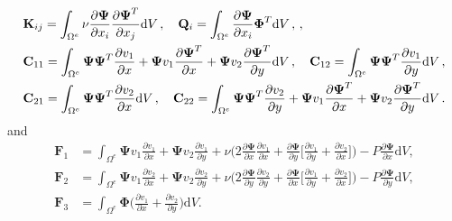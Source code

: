 \documentclass[]{article}
\begin{document}
\begin{equation}\label{eq13}
	\begin{aligned}
		&\mathbf{K}_{ij} = \int_{\Omega^e} \nu \frac{\partial\boldsymbol{\Psi}}{\partial x_i} \frac{\partial\boldsymbol{\Psi}^T}{\partial x_j}\mathrm{d}V\thinspace, \quad \mathbf{Q}_i = \int_{\Omega^e}\frac{\partial\boldsymbol{\Psi}}{\partial x_i} \boldsymbol{\Phi}^T \mathrm{d}V\thinspace, \thinspace,\\
		&\mathbf{C}_{11} = \int_{\Omega^e} \boldsymbol{\Psi} \boldsymbol{\Psi}^T \frac{\partial v_1}{\partial x} + \boldsymbol{\Psi} v_1 \frac{\partial \boldsymbol{\Psi}^T}{\partial x} + \boldsymbol{\Psi} v_2 \frac{\partial \boldsymbol{\Psi}^T}{\partial y}\mathrm{d}V\thinspace, \quad
		\mathbf{C}_{12} = \int_{\Omega^e}\boldsymbol{\Psi} \boldsymbol{\Psi}^T \frac{\partial v_1}{\partial y} \mathrm{d}V\thinspace,\\
		&\mathbf{C}_{21} = \int_{\Omega^e} \boldsymbol{\Psi} \boldsymbol{\Psi}^T \frac{\partial v_2}{\partial x}\mathrm{d}V\thinspace,\quad
		\mathbf{C}_{22} = \int_{\Omega^e} \boldsymbol{\Psi} \boldsymbol{\Psi}^T \frac{\partial v_2}{\partial y} + \boldsymbol{\Psi} v_1 \frac{\partial \boldsymbol{\Psi}^T}{\partial x} + \boldsymbol{\Psi} v_2 \frac{\partial \boldsymbol{\Psi}^T}{\partial y}\mathrm{d}V\thinspace.		
	\end{aligned}
\end{equation}
and
\begin{equation}\label{eq15}
	\begin{aligned}
		\mathbf{F}_1 &=\int_{\Omega^e} \boldsymbol{\Psi} v_1 \frac{\partial v_1}{\partial x}
		+ \boldsymbol{\Psi}v_2 \frac{\partial v_1}{\partial y}
		+ \nu  \Big(2\frac{\partial \boldsymbol{\Psi}}{\partial x}\frac{\partial v_1}{\partial x} + \frac{\partial \boldsymbol{\Psi}
		}{\partial y}\Big[\frac{\partial v_1}{\partial y} + \frac{\partial v_2}{\partial x}\Big]\Big) -P \frac{\partial \boldsymbol{\Psi}}{\partial x} \mathrm{d}V,\\
		\mathbf{F}_2 &=\int_{\Omega^e} \boldsymbol{\Psi} v_1 \frac{\partial v_2}{\partial x} 
		+ \boldsymbol{\Psi}v_2 \frac{\partial v_2}{\partial y} 
		+ \nu  \Big(2\frac{\partial \boldsymbol{\Psi}}{\partial y}\frac{\partial v_2}{\partial y} + \frac{\partial \boldsymbol{\Psi}
		}{\partial x} \Big[ \frac{\partial v_1}{\partial y} + \frac{\partial v_2}{\partial x}\Big]\Big) 
		-P \frac{\partial \boldsymbol{\Psi}}{\partial y} \mathrm{d}V,\\
		\mathbf{F}_3 &=\int_{\Omega^e} \boldsymbol{\Phi} \Big(\frac{\partial v_1}{\partial x} + \frac{\partial v_2}{\partial y}\Big)\mathrm{d}V .
	\end{aligned}
\end{equation}
\end{document}
